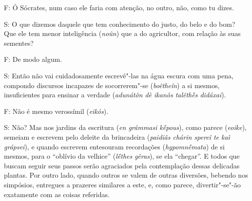  

\bekker{[276c]} F: Ó Sócrates, num caso ele faria com atenção, no outro, não,
como tu dizes.

 

S: O que dizemos daquele que tem conhecimento do justo, do belo e do
bom? Que ele tem menor inteligência (\emph{noûn}) que a do agricultor,
com relação às suas sementes?

F: De modo algum.

 

S: Então não vai cuidadosamente escrevê"-las na água escura com uma pena,
compondo discursos incapazes de socorrerem"-se (\emph{boêtheîn}) a si
mesmos, insuficientes para ensinar a verdade (\emph{adunátôn dè ikanôs
talêthḕs didáxai}).

F: Não é mesmo verossímil (\emph{eikós}).

 

\bekker{[276d]} S: Não? Mas nos jardins da escritura (\emph{en grámmasi
kḗpous}), como parece (\emph{eoike}), semeiam e escrevem pelo deleite da
brincadeira (\emph{paidiâs chárin spereî te kaì grápsei}), e quando
escrevem entesouram recordações (\emph{hypomnḗmata}) de si mesmos, para
o ``oblívio da velhice'' (\emph{lḗthes} \emph{gêras}), se ela
``chegar''. E todos que buscam seguir seus passos serão agraciados pela contemplação dessas
delicadas plantas. Por outro lado, quando outros se valem de outras
diversões, bebendo nos simpósios, entregues a prazeres similares a este,
e, como parece, divertir"-se"-ão exatamente com as coisas referidas.

 

